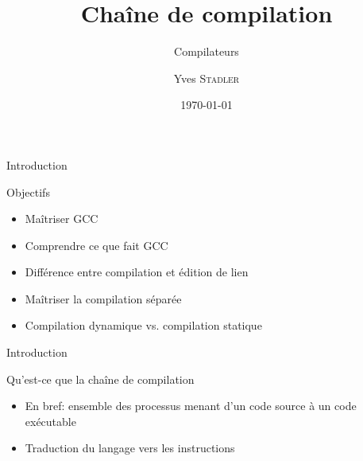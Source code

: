 
\title{Chaîne de compilation}
\subtitle{Compilateurs}

\author{Yves \textsc{Stadler}}

\date{\today}




\begin{frame}
\titlepage
\end{frame}


\def\ftitle{Introduction}
\begin{frame}[containsverbatim]{\ftitle}
\def\blocktitle{Objectifs}
\begin{block}{\blocktitle}
\begin{itemize}
\item Maîtriser GCC
\item Comprendre ce que fait GCC
\item Différence entre compilation et édition de lien
\item Maîtriser la compilation séparée
\item Compilation dynamique vs. compilation statique
\end{itemize}
\end{block}
\end{frame}


\def\ftitle{Introduction}
\begin{frame}[containsverbatim]{\ftitle}
\def\blocktitle{Qu'est-ce que la chaîne de compilation}
\begin{block}{\blocktitle}
\begin{itemize}
\item En bref: ensemble des processus menant d'un code source à un code exécutable
\item Traduction du langage vers les instructions
\end{itemize}
\end{block}
\end{frame}



